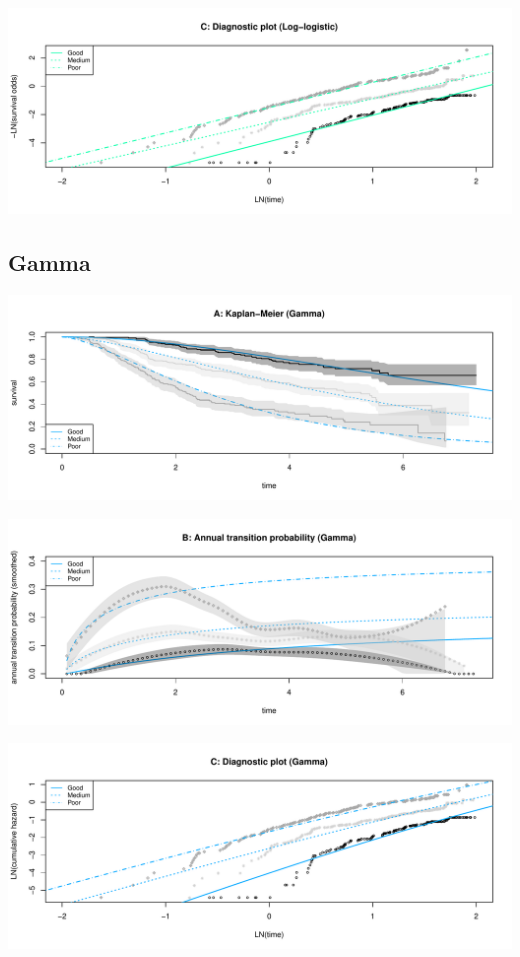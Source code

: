 \documentclass[
]{article}
\begin{document}
\begin{flushleft}\includegraphics[height=0.25\textheight]{Images/llog-3} \end{flushleft}

\clearpage

\hypertarget{gamma}{%
\subsection{Gamma}\label{gamma}}

\begin{flushleft}\includegraphics[height=0.25\textheight]{Images/gam-1} \end{flushleft}

\begin{flushleft}\includegraphics[height=0.25\textheight]{Images/gam-2} \end{flushleft}

\begin{flushleft}\includegraphics[height=0.25\textheight]{Images/gam-3} \end{flushleft}
\end{document}
